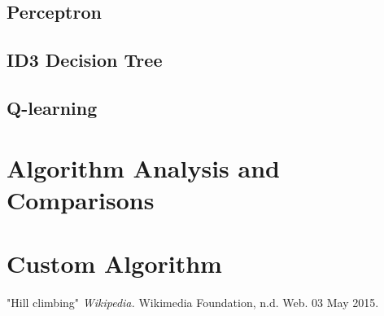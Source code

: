 \documentclass[a4paper,oneside,10pt]{report}
\begin{document}
\section{Perceptron}\label{perceptron}

\section{ID3 Decision Tree}\label{id3}

\section{Q-learning}\label{qlearn}

\chapter{Algorithm Analysis and Comparisons} \label{comparison}

\chapter{Custom Algorithm} \label{custom}

\clearpage
{}
\begin{thebibliography}{9}

"Hill climbing"
\textit{Wikipedia.} 
 Wikimedia Foundation, n.d. Web. 03 May 2015.

\end{thebibliography}

\appendix
\end{document}
